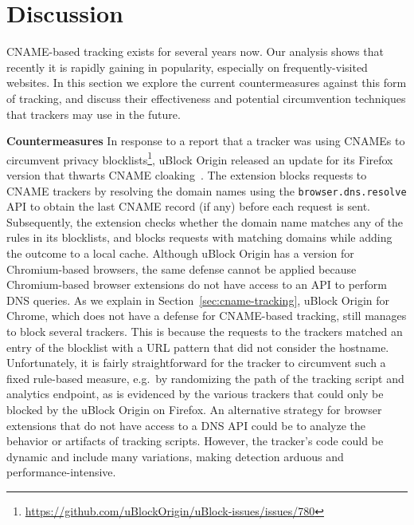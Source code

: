 \section{Discussion}
\label{sec:countermeasures-and-circumvention}
CNAME-based tracking exists for several years now. Our analysis shows that recently it is rapidly gaining in popularity, especially on frequently-visited websites.
In this section we explore the current countermeasures against this form of tracking, and discuss their effectiveness and potential circumvention techniques that trackers may use in the future.

\textbf{Countermeasures}
In response to a report that a tracker was using CNAMEs to circumvent privacy blocklists\footnote{\url{https://github.com/uBlockOrigin/uBlock-issues/issues/780}}, uBlock Origin released an update for its Firefox version that thwarts CNAME cloaking~\cite{ublockrelease}.
The extension blocks requests to CNAME trackers by resolving the domain names using the \texttt{browser.dns.resolve} API to obtain the last CNAME record (if any) before each request is sent.
Subsequently, the extension checks whether the domain name matches any of the rules in its blocklists, and blocks requests with matching domains while adding the outcome to a local cache.
Although uBlock Origin has a version for Chromium-based browsers, the same defense cannot be applied because Chromium-based browser extensions do not have access to an API to perform DNS queries.
As we explain in Section~\ref{sec:cname-tracking}, uBlock Origin for Chrome, which does not have a defense for CNAME-based tracking, still manages to block several trackers.
This is because the requests to the trackers matched an entry of the blocklist with a URL pattern that did not consider the hostname.
Unfortunately, it is fairly straightforward for the tracker to circumvent such a fixed rule-based measure, e.g.\ by randomizing the path of the tracking script and analytics endpoint, as is evidenced by the various trackers that could only be blocked by the uBlock Origin on Firefox.
An alternative strategy for browser extensions that do not have access to a DNS API could be to analyze the behavior or artifacts of tracking scripts.
However, the tracker's code could be dynamic and include many variations, making detection arduous and performance-intensive.

